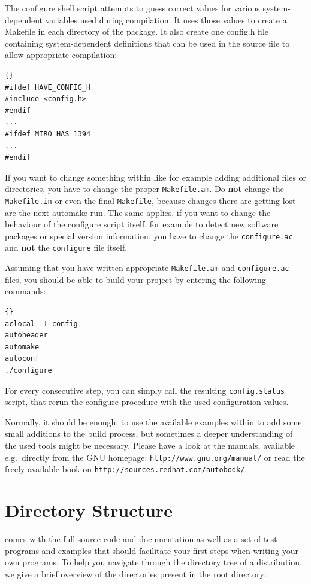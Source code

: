 \documentclass[10pt]{book}
\begin{document}
The configure shell script attempts to guess correct values for
various system-dependent variables used during compilation. It uses
those values to create a Makefile in each directory of the package.
It also create one config.h file containing system-dependent
definitions that can be used in the source file to allow appropriate
compilation:

\begin{lstlisting}[frame=tb]{}
#ifdef HAVE_CONFIG_H
#include <config.h>
#endif
...
#ifdef MIRO_HAS_1394
...
#endif
\end{lstlisting}

If you want to change something within \miro like for example adding
additional files or directories, you have to change the proper
\texttt{Makefile.am}. Do \textbf{not} change the \texttt{Makefile.in}
or even the final \texttt{Makefile}, because changes there are getting
lost are the next automake run. The same applies, if you want to
change the behaviour of the configure script itself, for example to
detect new software packages or special version information, you have
to change the \texttt{configure.ac} and \textbf{not} the
\texttt{configure} file itself.

Assuming that you have written appropriate \texttt{Makefile.am} and
\texttt{configure.ac} files, you should be able to build your project
by entering the following commands:

\begin{lstlisting}[frame=tb]{}
aclocal -I config
autoheader
automake
autoconf
./configure
\end{lstlisting}

For every consecutive step, you can simply call the resulting
\texttt{config.status} script, that rerun the configure procedure with
the used configuration values.

Normally, it should be enough, to use the available examples within
\miro to add some small additions to the build process, but sometimes
a deeper understanding of the used tools might be necessary. Please
have a look at the manuals, available e.g.\ directly from the GNU
homepage: \texttt{http://www.gnu.org/manual/} or read the freely
available book on \texttt{http://sources.redhat.com/autobook/}.

\section{\miro Directory Structure}

\miro comes with the full source code and documentation as well as a
set of test programs and examples that should facilitate your first
steps when writing your own programs. To help you navigate through the
directory tree of a \miro distribution, we give a brief overview of
the directories present in the \miro root directory:
\end{document}
